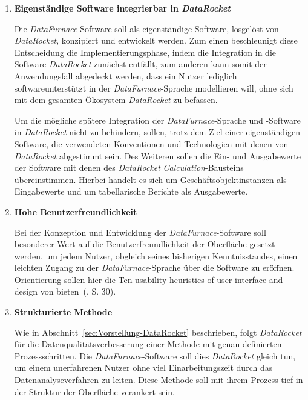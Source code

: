 \documentclass[
  language=german, %
  type=bachelor,%
  ngerman
]{isthesis}
\begin{document}
\begin{content}
\begin{enumerate}
    \item \textbf{Eigenständige Software integrierbar in \textit{DataRocket}}

      Die \textit{DataFurnace}-Software soll als eigenständige Software,
      losgelöst von \textit{DataRocket}, konzipiert und entwickelt werden. Zum
      einen beschleunigt diese Entscheidung die Implementierungsphase, indem
      die Integration in die Software \textit{DataRocket} zunächst entfällt,
      zum anderen kann somit der Anwendungsfall abgedeckt werden, dass ein Nutzer
      lediglich softwareunterstützt in der \textit{DataFurnace}-Sprache
      modellieren will, ohne sich mit dem gesamten Ökosystem
      \textit{DataRocket} zu befassen.

      Um die mögliche spätere Integration der \textit{DataFurnace}-Sprache und
      -Software in \textit{DataRocket} nicht zu behindern, sollen, trotz dem
      Ziel einer eigenständigen Software, die verwendeten Konventionen und
      Technologien mit denen von \textit{DataRocket} abgestimmt sein.  Des
      Weiteren sollen die Ein- und Ausgabewerte der Software mit denen des
      \textit{DataRocket} \textit{Calculation}-Bausteins übereinstimmen.
      Hierbei handelt es sich um Geschäftsobjektinstanzen als Eingabewerte und
      um tabellarische Berichte als Ausgabewerte.

    \item \textbf{Hohe Benutzerfreundlichkeit}

			Bei der Konzeption und Entwicklung der \textit{DataFurnace}-Software soll
			besonderer Wert auf die Benutzerfreundlichkeit der Oberfläche gesetzt
			werden, um jedem Nutzer, obgleich seines bisherigen Kenntnisstandes,
			einen leichten Zugang zu der \textit{DataFurnace}-Sprache über die
			Software zu eröffnen. Orientierung sollen hier die \glqq{}Ten usability
			heuristics of user interface and design\grqq{} von
			\textsc{\citeauthor{nielsen1994heuristic}}
			bieten~(\citeyear{nielsen1994heuristic}, S. 30).

    \item \textbf{Strukturierte Methode}

			Wie in Abschnitt~\ref{sec:Vorstellung-DataRocket} beschrieben, folgt
			\textit{DataRocket} für die Datenqualitätsverbesserung einer Methode mit
			genau definierten Prozessschritten. Die \textit{DataFurnace}-Software
			soll dies \textit{DataRocket} gleich tun, um einem unerfahrenen Nutzer
			ohne viel Einarbeitungszeit durch das Datenanalyseverfahren zu leiten.
			Diese Methode soll mit ihrem Prozess tief in der Struktur der Oberfläche
			verankert sein.


\end{enumerate}
\end{content}
\end{document}
